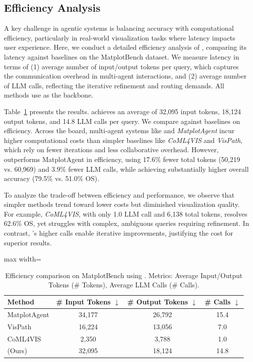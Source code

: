 
\subsection{Efficiency Analysis}

A key challenge in agentic systems is balancing accuracy with computational efficiency, particularly in real-world visualization tasks where latency impacts user experience. 
Here, we conduct a detailed efficiency analysis of \methodname{}, comparing its latency against baselines on the MatplotBench dataset. 
We measure latency in terms of (1) average number of input/output tokens per query, which captures the communication overhead in multi-agent interactions, and (2) average number of LLM calls, reflecting the iterative refinement and routing demands. 
All methods use  as the backbone. 

Table~\ref{tab:efficiency-comparison} presents the results. \methodname{} achieves an average of 32,095 input tokens, 18,124 output tokens, and 14.8 LLM calls per query.
We compare \methodname{} against baselines on efficiency. Across the board, multi-agent systems like \methodname{} and \textit{MatplotAgent} incur higher computational costs than simpler baselines like \textit{CoML4VIS} and \textit{VisPath}, which rely on fewer iterations and less collaborative overhead. However, \methodname{} outperforms MatplotAgent in efficiency, using 17.6\% fewer total tokens (50,219 vs. 60,969) and 3.9\% fewer LLM calls, while achieving substantially higher overall accuracy (79.5\% vs. 51.0\% OS).

To analyze the trade-off between efficiency and performance, we observe that simpler methods trend toward lower costs but diminished visualization quality. For example, \textit{CoML4VIS}, with only 1.0 LLM call and 6,138 total tokens, resolves 62.6\% OS, yet struggles with complex, ambiguous queries requiring refinement. In contrast, \methodname{}'s higher calls enable iterative improvements, justifying the cost for superior results.



\begin{table}[t]
\caption{Efficiency comparison on MatplotBench using . Metrics: Average Input/Output Tokens (\# Tokens), Average LLM Calls (\# Calls).}
\centering
\footnotesize
\setlength{\tabcolsep}{8pt}
\begin{adjustbox}{max width=\linewidth}
\begin{tabular}{lccc}
\toprule
\textbf{Method} & \textbf{\# Input Tokens $\downarrow$} & \textbf{\# Output Tokens $\downarrow$} & \textbf{\# Calls $\downarrow$} \\
\midrule
MatplotAgent       & 34,177 & 26,792 & 15.4 \\
VisPath            & 16,224 & 13,056 & 7.0 \\
CoML4VIS           & 2,350 & 3,788 & 1.0 \\ \midrule
\methodname{} (Ours) & 32,095 & 18,124 & 14.8 \\
\bottomrule
\end{tabular}
\end{adjustbox}
\label{tab:efficiency-comparison}
\end{table}

